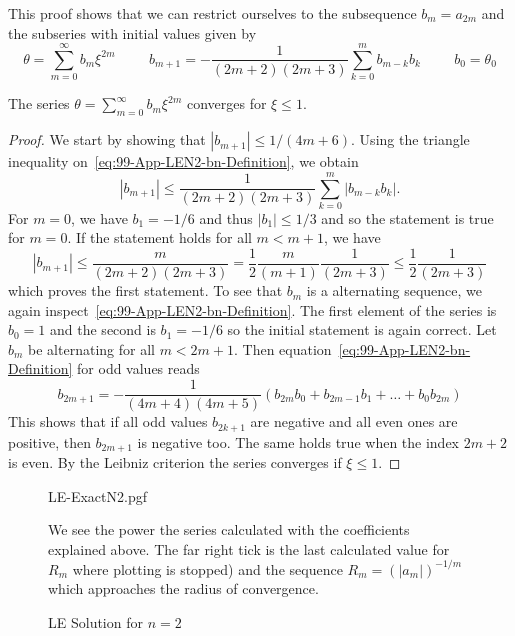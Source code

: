 This proof shows that we can restrict ourselves to the subsequence $b_m=a_{2m}$ and the subseries with initial values given by
\begin{equation}
	\theta = \sum\limits_{m=0}^\infty b_m\xi^{2m} \hspace{1cm} b_{m+1} =
	-\frac{1}{(2m+2)(2m+3)}\sum\limits_{k=0}^m b_{m-k}b_k \hspace{1cm} b_0=\theta_0
	\label{eq:99-App-LEN2-bn-Definition}
\end{equation}
\begin{theorem}
	The series $\theta=\sum\limits_{m=0}^\infty b_m\xi^{2m}$ converges for $\xi\leq1$.
\end{theorem}
\begin{proof}
	We start by showing that $|b_{m+1}|\leq1/(4m+6)$.
	Using the triangle inequality on~\ref{eq:99-App-LEN2-bn-Definition}, we obtain
	\begin{equation}
		|b_{m+1}| \leq \frac{1}{(2m+2)(2m+3)}\sum\limits_{k=0}^m|b_{m-k}b_k|.
		\label{eq:99-App-LE-New-Recursive-bn}
	\end{equation}
	For $m=0$, we have $b_1=-1/6$ and thus $|b_1|\leq1/3$ and so the statement is true for $m=0$.
	If the statement holds for all $m<m+1$, we have
	\begin{equation}
		|b_{m+1}| \leq \frac{m}{(2m+2)(2m+3)} = \frac{1}{2}\frac{m}{(m+1)}\frac{1}{(2m+3)}
		\leq\frac{1}{2}\frac{1}{(2m+3)}
		\label{eq:99-App-LE-New-Bn-Inequality}
	\end{equation}
	which proves the first statement.
	To see that $b_m$ is a alternating sequence, we again inspect~\ref{eq:99-App-LEN2-bn-Definition}.
	The first element of the series is $b_0=1$ and the second is $b_1=-1/6$ so the initial statement is again correct.
	Let $b_m$ be alternating for all $m<2m+1$.
	Then equation~\ref{eq:99-App-LEN2-bn-Definition} for odd values reads
	\begin{equation}
		b_{2m+1} = -\frac{1}{(4 m+4)(4 m+5)}\left(b_{2m}b_0+b_{2m-1}b_1+\dots+b_0 b_{2m}\right)
		\label{eq:99-App-LE-Bn-Recursion}
	\end{equation}
	This shows that if all odd values $b_{2k+1}$ are negative and all even ones are positive,
	then $b_{2m+1}$ is negative too.
	The same holds true when the index $2m+2$ is even.
	By the Leibniz criterion the series converges if $\xi\leq1$.
\end{proof}
\begin{figure}[H]
	{\centering
	{LE-ExactN2.pgf}
	}%
	\caption[ Solution for $n=2$]{\ac{LE} Solution for $n=2$}
	\label{fig:99-App-Plt-LEN2-Plot}
	\small
	We see the power the series calculated with the coefficients explained above.
	The far right tick is the last calculated value for $R_m$ where plotting is stopped) and the sequence $R_m=(|a_m|)^{-1/m}$ which approaches the radius of convergence.
\end{figure}\noindent
